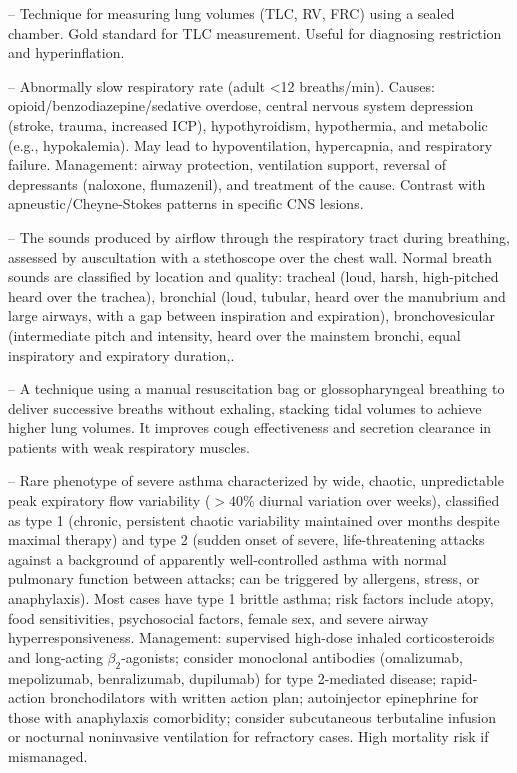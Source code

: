 -- Technique for measuring lung volumes (TLC, RV, FRC) using a sealed chamber. Gold standard for TLC measurement. Useful for diagnosing restriction and hyperinflation.

-- Abnormally slow respiratory rate (adult <12 breaths/min). Causes: opioid/benzodiazepine/sedative overdose, central nervous system depression (stroke, trauma, increased ICP), hypothyroidism, hypothermia, and metabolic (e.g., hypokalemia). May lead to hypoventilation, hypercapnia, and respiratory failure. Management: airway protection, ventilation support, reversal of depressants (naloxone, flumazenil), and treatment of the cause. Contrast with apneustic/Cheyne-Stokes patterns in specific CNS lesions.

-- The sounds produced by airflow through the respiratory tract during breathing, assessed by auscultation with a stethoscope over the chest wall. Normal breath sounds are classified by location and quality: tracheal (loud, harsh, high-pitched heard over the trachea), bronchial (loud, tubular, heard over the manubrium and large airways, with a gap between inspiration and expiration), bronchovesicular (intermediate pitch and intensity, heard over the mainstem bronchi, equal inspiratory and expiratory duration,.

-- A technique using a manual resuscitation bag or glossopharyngeal breathing to deliver successive breaths without exhaling, stacking tidal volumes to achieve higher lung volumes. It improves cough effectiveness and secretion clearance in patients with weak respiratory muscles.

-- Rare phenotype of severe asthma characterized by wide, chaotic, unpredictable peak expiratory flow variability ($> 40\%$ diurnal variation over weeks), classified as type 1 (chronic, persistent chaotic variability maintained over months despite maximal therapy) and type 2 (sudden onset of severe, life-threatening attacks against a background of apparently well-controlled asthma with normal pulmonary function between attacks; can be triggered by allergens, stress, or anaphylaxis). Most cases have type 1 brittle asthma; risk factors include atopy, food sensitivities, psychosocial factors, female sex, and severe airway hyperresponsiveness. Management: supervised high-dose inhaled corticosteroids and long-acting $\beta_2$-agonists; consider monoclonal antibodies (omalizumab, mepolizumab, benralizumab, dupilumab) for type 2-mediated disease; rapid-action bronchodilators with written action plan; autoinjector epinephrine for those with anaphylaxis comorbidity; consider subcutaneous terbutaline infusion or nocturnal noninvasive ventilation for refractory cases. High mortality risk if mismanaged.

